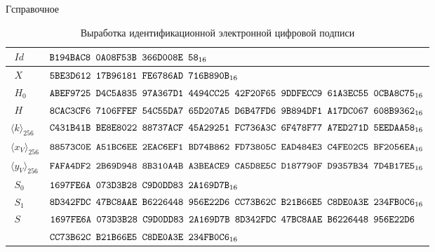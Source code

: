 \begin{appendix}{Г}{справочное}
\begin{table}[!h]
\caption{Выработка идентификационной электронной цифровой подписи}
\label{Table.TEST.IdSign}
{\small
\begin{tabular}{|l|l|}
\hline
$\phantom{\langle}Id$ & 
$\texttt{B194BAC8~0A08F53B~366D008E~58}_{16}$\\
%
\hline
$\phantom{\langle}X$ & 
$\texttt{5BE3D612~17B96181~FE6786AD~716B890B}_{16}$\\
%
\dhline
$\phantom{\langle}H_0$ & 
$\texttt{ABEF9725~D4C5A835~97A367D1~4494CC25~42F20F65~9DDFECC9~61A3EC55~0CBA8C75}_{16}$\\
%
\hline
$\phantom{\langle}H$ & 
$\texttt{8CAC3CF6~7106FFEF~54C55DA7~65D207A5~D6B47FD6~9B894DF1~A17DC067~608B9362}_{16}$\\
%
\hline
$\langle k\rangle_{256}$ & 
$\texttt{C431B41B~BE8E8022~88737ACF~45A29251~FC736A3C~6F478F77~A7ED271D~5EEDAA58}_{16}$\\
%
\hline
$\langle x_V\rangle_{256}$ & 
$\texttt{88573C0E~A51BC6EE~2EAC6EF1~BD74B862~FD73805C~EAD484E3~C4FE02C5~BF2056EA}_{16}$\\
%
\hline
$\langle y_V\rangle_{256}$ & 
$\texttt{FAFA4DF2~2B69D948~8B310A4B~A3BEACE9~CA5D8E5C~D187790F~D9357B34~7D4B17E5}_{16}$\\
%
\hline
$\phantom{\langle}S_0$ & 
$\texttt{1697FE6A~073D3B28~C9D0DD83~2A169D7B}_{16}$\\
%
\hline
$\phantom{\langle}S_1$ & 
$\texttt{8D342FDC~47BC8AAE~B6226448~956E22D6~CC73B62C~B21B66E5~C8DE0A3E~234FB0C6}_{16}$\\
%
\dhline
$\phantom{\langle}S$ & 
$\texttt{1697FE6A~073D3B28~C9D0DD83~2A169D7B~8D342FDC~47BC8AAE~B6226448~956E22D6}$\\
&
$\texttt{CC73B62C~B21B66E5~C8DE0A3E~234FB0C6}_{16}$\\
\hline
\end{tabular}
}
\end{table}


\end{appendix}
